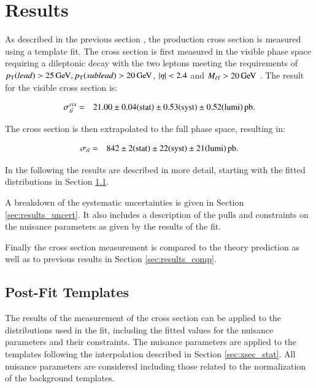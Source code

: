 
\chapter{Results}

As described in the previous section , the \ttbar production cross section is measured using a template fit.
The cross section is first measured in the visible phase space requiring a dileptonic decay with the two leptons meeting the requirements of $p_{\mathrm{T}} (lead) > 25 \,\text{Ge\hspace{-.08em}V}, p_{\mathrm{T}} (sublead) > 20\,\text{Ge\hspace{-.08em}V}$, $\lvert \eta \rvert < 2.4$ 
and $M_{\ell\ell} > 20 \,\text{Ge\hspace{-.08em}V}$ .
The result for the visible cross section is:

\begin{eqnarray*}
\sigma^{vis}_{t\bar{t}} & = & 21.00 \pm 0.04 ({\rm stat}) \pm 0.53 ({\rm syst}) \pm 0.52({\rm lumi})\mbox{\ensuremath{\,\text{pb}}}. 
\end{eqnarray*}

The cross section is then extrapolated to the full phase space, resulting in:

 \begin{eqnarray*}
\sigma_{t\bar{t}} & = & 842 \pm 2 ({\rm stat}) \pm 22 ({\rm syst}) \pm 21 ({\rm lumi}) \mbox{\ensuremath{\,\text{pb}}}.
\end{eqnarray*}

In the following the results are described in more detail, starting with the fitted distributions in Section \ref{sec:results_templates}.

A breakdown of the systematic uncertainties is given in Section \ref{sec:results_uncert}.
It also includes a description of the pulls and constraints on the nuisance parameters as given by the results of the fit.

Finally the cross section measurement is compared to the theory prediction as well as to previous results in Section \ref{sec:results_comp}.

\section{Post-Fit Templates}
\label{sec:results_templates}

The results of the measurement of the \ttbar cross section can be applied to the distributions used in the fit, including the fitted values for the
nuisance parameters and their constraints. The nuisance parameters are applied to the templates following the interpolation described in Section \ref{sec:xsec_stat}.
All nuisance parameters are considered including those related to the normalization of the background templates.

